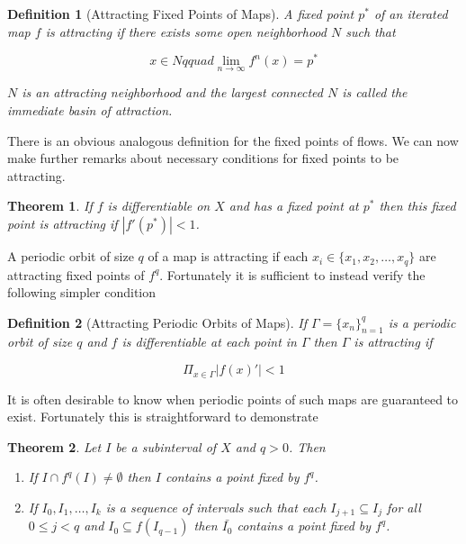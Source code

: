 \documentclass{article}
\newtheorem{theorem}{Theorem}
\newtheorem{definition}{Definition}
\begin{document}
\begin{definition}[Attracting Fixed Points of Maps]
    A fixed point $p^*$ of an iterated map $f$ is attracting if there exists some open neighborhood $N$ such that 

    \begin{equation*}
        x \in N qquad \lim_{n \rightarrow \infty}f^n(x) = p^*
    \end{equation*}

    $N$ is an attracting neighborhood and the largest connected $N$ is called the immediate basin of 
    attraction. 
\end{definition}

There is an obvious analogous definition for the fixed points of flows. We can now make further remarks 
about necessary conditions for fixed points to be attracting.

\begin{theorem}
    If $f$ is differentiable on $X$ and has a fixed point at $p^*$ then this fixed point is attracting 
    if $|f'(p^*)| < 1$.
\end{theorem}

A periodic orbit of size $q$ of a map is attracting if each $x_i \in \{x_1,x_2,\dots,x_q\}$ are 
attracting fixed points of $f^q$. Fortunately it is sufficient to instead verify the following 
simpler condition

\begin{definition}[Attracting Periodic Orbits of Maps]
    If $\Gamma = \{x_n\}_{n=1}^q$ is a periodic orbit of size $q$ and $f$ is differentiable at each point 
    in $\Gamma$ then $\Gamma$ is attracting if 

    \begin{equation*}
        \Pi_{x \in \Gamma}|f(x)'|<1
    \end{equation*}
\end{definition}

It is often desirable to know when periodic points of such maps are guaranteed to exist. Fortunately 
this is straightforward to demonstrate

\begin{theorem}
    Let $I$ be a subinterval of $X$ and $q > 0$. Then 

    \begin{enumerate}
        \item If $I \cap f^q(I) \neq \emptyset$ then $I$ contains a point fixed by $f^q$.
        \item If $I_0,I_1,\dots,I_k$ is a sequence of intervals such that each $I_{j+1} \subseteq I_j$ 
        for all $0 \leq j < q$ and $I_0 \subseteq f(I_{q-1})$ then $\bar{I_0}$ contains a point fixed 
        by $f^q$.
    \end{enumerate}
\end{theorem}
\end{document}
